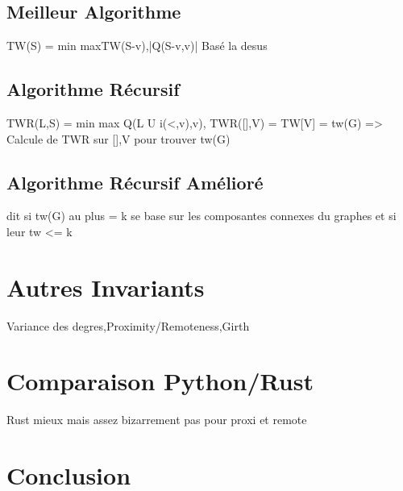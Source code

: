 \documentclass[a4paper, 12pt]{article}
\begin{document}
\subsection{Meilleur Algorithme}
TW(S) = min max{TW(S-{v}),|Q(S-{v},v)|}
Basé la desus
\subsection{Algorithme Récursif}
TWR(L,S) = min max Q(L U i(<,v),v),
TWR([],V) = TW[V] = tw(G)
=> Calcule de TWR sur [],V pour trouver tw(G)
\subsection{Algorithme Récursif Amélioré}
dit si tw(G) au plus = k
se base sur les composantes connexes du graphes et si leur tw <= k

\section{Autres Invariants}
Variance des degres,Proximity/Remoteness,Girth
\section{Comparaison Python/Rust}
Rust mieux mais assez bizarrement pas pour proxi et remote
\section{Conclusion}
\end{document}

